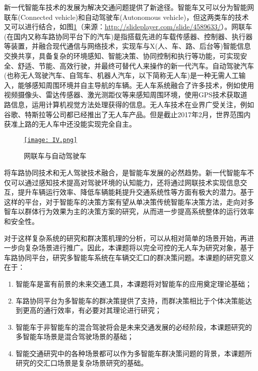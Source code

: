 新一代智能车技术的发展为解决交通问题提供了新途径。智能车又可以分为智能网联车(Connected vehicle)和自动驾驶车(Autonomous vehicle)，但这两类车的技术又可以进行结合，如图\ref{fig:IV}（来源：\url{http://slideplayer.com/slide/4589633/}）。网联车(在国内又称车路协同平台下的汽车)是指搭载先进的车载传感器、控制器、执行器等装置，并融合现代通信与网络技术，实现车与X(人、车、路、后台等)智能信息交换共享，具备复杂的环境感知、智能决策、协同控制和执行等功能，可实现安全、舒适、节能、高效行驶，并最终可替代人来操作的新一代汽车。自动驾驶汽车(也称无人驾驶汽车、自驾车、机器人汽车\cite{Thrun2010Toward}，以下简称无人车)是一种无需人工输入，能够感知周围环境并自主导航的车辆。无人车系统融合了许多技术，例如使用视频摄像头、雷达传感器、激光测距仪等来感知周围环境，使用GPS技术获取道路信息，运用计算机视觉方法处理获得的信息。无人车技术在业界广受关注，例如谷歌\cite{google2017self}、特斯拉\cite{tesla2017model}等公司都已经推出了无人车产品。但是截止2017年2月，世界范围内获准上路的无人车中还没能实现完全自主。

\begin{figure}
\centering
\href{http://slideplayer.com/slide/4589633/}{\texttt{[image: IV.png]}}
\caption{网联车与自动驾驶车}
\label{fig:IV}
\end{figure}

将车路协同技术和无人驾驶技术融合，是智能车发展的必然趋势。新一代智能车不仅可以通过感知技术提高对驾驶环境的认知能力，还将通过网联技术实现信息交互，提升车辆运行效率、降低车辆能耗提升交通系统性等方面有极大的潜力。基于这样的平台，对于智能车的决策方案有望从单决策传统智能车决策方法，走向对多智车以群体行为效果为主的决策方案的研究，从而进一步提高系统整体的运行效率和安全性。

对于这样复杂系统的研究和群决策机理的分析，可以从相对简单的场景开始，再进一步向复杂场景进行推广。因此，本课题将以完全可控的无人车为研究对象，基于车路协同平台，研究多智能车系统在车辆交汇口的群决策问题。本课题的研究意义在于：

\begin{enumerate}[label=(\arabic*),wide=\parindent]
\item 智能车是富有前景的未来交通工具，本课题将对智能车的应用奠定理论基础；
\item 车路协同平台为多智能车的群决策提供了支持，而群决策相比于个体决策能达到更高的通行效率，有必要对其理论进行研究；
\item 智能车于非智能车的混合驾驶将会是未来交通发展的必经阶段，本课题研究的多智能车场景是混合驾驶场景的基础；
\item 智能交通研究中的各种场景都可以作为多智能车群决策问题的背景，本课题所研究的交汇口场景是复杂场景研究的基础。
\end{enumerate}

